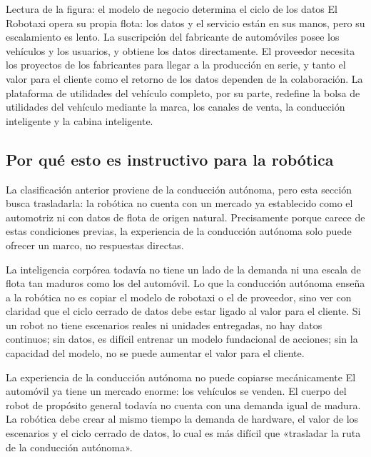\documentclass[a4paper]{article}
\begin{document}
\begin{knowledgebox}{Lectura de la figura: el modelo de negocio determina el ciclo de los datos}
El Robotaxi opera su propia flota: los datos y el servicio están en sus manos, pero su escalamiento es lento. La suscripción del fabricante de automóviles posee los vehículos y los usuarios, y obtiene los datos directamente. El proveedor necesita los proyectos de los fabricantes para llegar a la producción en serie, y tanto el valor para el cliente como el retorno de los datos dependen de la colaboración. La plataforma de utilidades del vehículo completo, por su parte, redefine la bolsa de utilidades del vehículo mediante la marca, los canales de venta, la conducción inteligente y la cabina inteligente.
\end{knowledgebox}

\subsection{Por qué esto es instructivo para la robótica}

La clasificación anterior proviene de la conducción autónoma, pero esta sección busca trasladarla: la robótica no cuenta con un mercado ya establecido como el automotriz ni con datos de flota de origen natural. Precisamente porque carece de estas condiciones previas, la experiencia de la conducción autónoma solo puede ofrecer un marco, no respuestas directas.

La inteligencia corpórea todavía no tiene un lado de la demanda ni una escala de flota tan maduros como los del automóvil. Lo que la conducción autónoma enseña a la robótica no es copiar el modelo de robotaxi o el de proveedor, sino ver con claridad que el ciclo cerrado de datos debe estar ligado al valor para el cliente. Si un robot no tiene escenarios reales ni unidades entregadas, no hay datos continuos; sin datos, es difícil entrenar un modelo fundacional de acciones; sin la capacidad del modelo, no se puede aumentar el valor para el cliente.

\begin{warningbox}{La experiencia de la conducción autónoma no puede copiarse mecánicamente}
El automóvil ya tiene un mercado enorme: los vehículos se venden. El cuerpo del robot de propósito general todavía no cuenta con una demanda igual de madura. La robótica debe crear al mismo tiempo la demanda de hardware, el valor de los escenarios y el ciclo cerrado de datos, lo cual es más difícil que «trasladar la ruta de la conducción autónoma».
\end{warningbox}
\end{document}
